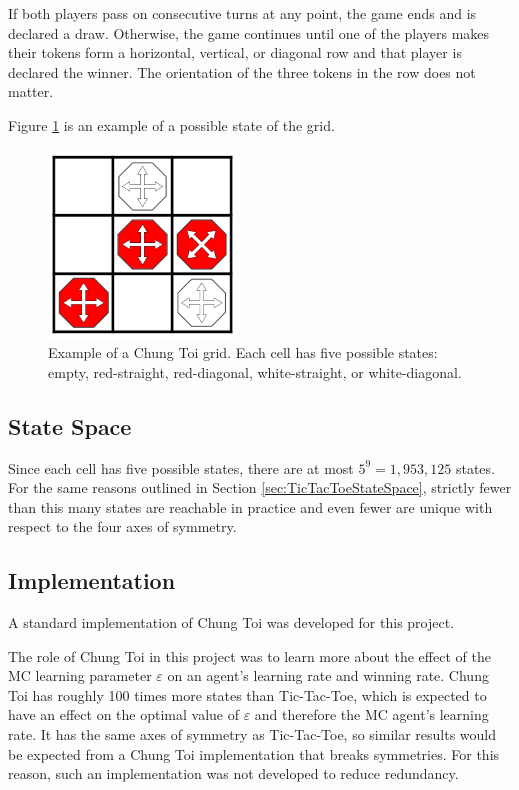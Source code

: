 \documentclass[11pt,a4paper]{report}
\begin{document}
If both players pass on consecutive turns at any point, the game ends and is declared a draw. Otherwise, the game continues until one of the players makes their tokens form a horizontal, vertical, or diagonal row and that player is declared the winner. The orientation of the three tokens in the row does not matter.

Figure \ref{chung-toi-grid-example} is an example of a possible state of the grid.

\begin{figure}[htbp]
	\begin{center}
		\includegraphics[width=50mm]{chung_toi_grid_example.png}
		\caption{Example of a Chung Toi grid. Each cell has five possible states: empty, red-straight, red-diagonal, white-straight, or white-diagonal.}
		\label{chung-toi-grid-example}
	\end{center}
\end{figure}


\subsection{State Space}

Since each cell has five possible states, there are at most $5^9 = 1,953,125$ states. For the same reasons outlined in Section \ref{sec:TicTacToeStateSpace}, strictly fewer than this many states are reachable in practice and even fewer are unique with respect to the four axes of symmetry.


\subsection{Implementation}

A standard implementation of Chung Toi was developed for this project.

The role of Chung Toi in this project was to learn more about the effect of the MC learning parameter $\varepsilon$ on an agent's learning rate and winning rate. Chung Toi has roughly 100 times more states than Tic-Tac-Toe, which is expected to have an effect on the optimal value of $\varepsilon$ and therefore the MC agent's learning rate. It has the same axes of symmetry as Tic-Tac-Toe, so similar results would be expected from a Chung Toi implementation that breaks symmetries. For this reason, such an implementation was not developed to reduce redundancy.
\end{document}

